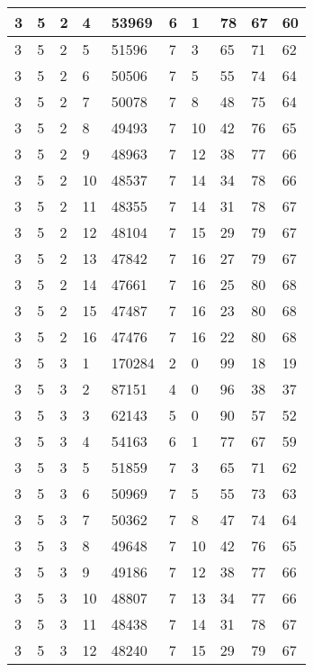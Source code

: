 \begin{table}[!ht]
\begin{tabular}{|l|l|l|l|l|l|l|l|l|l|}
        3 & 5 & 2 & 4 & 53969 & 6 & 1 & 78 & 67 & 60 \\ \hline
        3 & 5 & 2 & 5 & 51596 & 7 & 3 & 65 & 71 & 62 \\ \hline
        3 & 5 & 2 & 6 & 50506 & 7 & 5 & 55 & 74 & 64 \\ \hline
        3 & 5 & 2 & 7 & 50078 & 7 & 8 & 48 & 75 & 64 \\ \hline
        3 & 5 & 2 & 8 & 49493 & 7 & 10 & 42 & 76 & 65 \\ \hline
        3 & 5 & 2 & 9 & 48963 & 7 & 12 & 38 & 77 & 66 \\ \hline
        3 & 5 & 2 & 10 & 48537 & 7 & 14 & 34 & 78 & 66 \\ \hline
        3 & 5 & 2 & 11 & 48355 & 7 & 14 & 31 & 78 & 67 \\ \hline
        3 & 5 & 2 & 12 & 48104 & 7 & 15 & 29 & 79 & 67 \\ \hline
        3 & 5 & 2 & 13 & 47842 & 7 & 16 & 27 & 79 & 67 \\ \hline
        3 & 5 & 2 & 14 & 47661 & 7 & 16 & 25 & 80 & 68 \\ \hline
        3 & 5 & 2 & 15 & 47487 & 7 & 16 & 23 & 80 & 68 \\ \hline
        3 & 5 & 2 & 16 & 47476 & 7 & 16 & 22 & 80 & 68 \\ \hline
        3 & 5 & 3 & 1 & 170284 & 2 & 0 & 99 & 18 & 19 \\ \hline
        3 & 5 & 3 & 2 & 87151 & 4 & 0 & 96 & 38 & 37 \\ \hline
        3 & 5 & 3 & 3 & 62143 & 5 & 0 & 90 & 57 & 52 \\ \hline
        3 & 5 & 3 & 4 & 54163 & 6 & 1 & 77 & 67 & 59 \\ \hline
        3 & 5 & 3 & 5 & 51859 & 7 & 3 & 65 & 71 & 62 \\ \hline
        3 & 5 & 3 & 6 & 50969 & 7 & 5 & 55 & 73 & 63 \\ \hline
        3 & 5 & 3 & 7 & 50362 & 7 & 8 & 47 & 74 & 64 \\ \hline
        3 & 5 & 3 & 8 & 49648 & 7 & 10 & 42 & 76 & 65 \\ \hline
        3 & 5 & 3 & 9 & 49186 & 7 & 12 & 38 & 77 & 66 \\ \hline
        3 & 5 & 3 & 10 & 48807 & 7 & 13 & 34 & 77 & 66 \\ \hline
        3 & 5 & 3 & 11 & 48438 & 7 & 14 & 31 & 78 & 67 \\ \hline
        3 & 5 & 3 & 12 & 48240 & 7 & 15 & 29 & 79 & 67 \\ \hline

\end{tabular}
\end{table}

